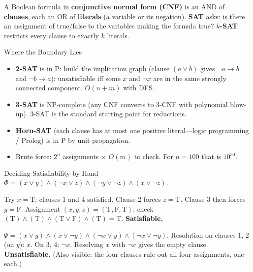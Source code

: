 \documentclass[11pt,a4paper]{article}
\begin{document}
\begin{definition}
A Boolean formula in \textbf{conjunctive normal form (CNF)} is an AND of \textbf{clauses}, each an OR of \textbf{literals} (a variable or its negation). \textbf{SAT} asks: is there an assignment of true/false to the variables making the formula true? \textbf{$k$-SAT} restricts every clause to exactly $k$ literals.
\end{definition}

\begin{keyconcept}{Where the Boundary Lies}
\begin{itemize}
    \item \textbf{2-SAT} is in P: build the implication graph (clause $(a \lor b)$ gives $\lnot a \to b$ and $\lnot b \to a$); unsatisfiable iff some $x$ and $\lnot x$ are in the same strongly connected component. $O(n + m)$ with DFS.
    \item \textbf{3-SAT} is NP-complete (any CNF converts to 3-CNF with polynomial blow-up). 3-SAT is the standard starting point for reductions.
    \item \textbf{Horn-SAT} (each clause has at most one positive literal---logic programming / Prolog) is in P by unit propagation.
    \item Brute force: $2^n$ assignments $\times$ $O(m)$ to check. For $n = 100$ that is $10^{30}$.
\end{itemize}
\end{keyconcept}

\begin{worked}{Deciding Satisfiability by Hand}
$\Phi = (x \lor y) \land (\lnot x \lor z) \land (\lnot y \lor \lnot z) \land (x \lor \lnot z)$.

Try $x = \mathrm{T}$: clauses 1 and 4 satisfied. Clause 2 forces $z = \mathrm{T}$. Clause 3 then forces $y = \mathrm{F}$. Assignment $(x, y, z) = (\mathrm T, \mathrm F, \mathrm T)$: check $(\mathrm T) \land (\mathrm T) \land (\mathrm T \lor \mathrm F) \land (\mathrm T) = \mathrm T$. \textbf{Satisfiable.}

$\Psi = (x \lor y) \land (x \lor \lnot y) \land (\lnot x \lor y) \land (\lnot x \lor \lnot y)$.
Resolution on clauses 1, 2 (on $y$): $x$. On 3, 4: $\lnot x$. Resolving $x$ with $\lnot x$ gives the empty clause. \textbf{Unsatisfiable.} (Also visible: the four clauses rule out all four assignments, one each.)
\end{worked}
\end{document}
